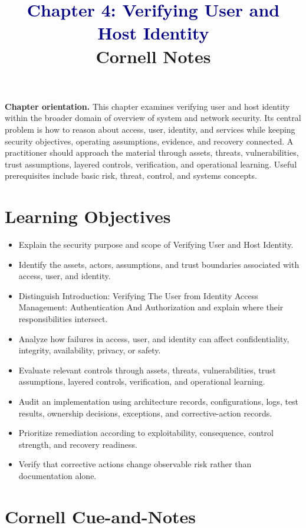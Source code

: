 \documentclass[11pt]{article}
\title{\textcolor{Navy}{Chapter 4: Verifying User and Host Identity}\\[2mm]\large Cornell Notes}
\author{}
\date{}
\begin{document}
\maketitle
\thispagestyle{fancy}
\vspace{-1.5em}
\begin{orientationbox}
\textbf{Chapter orientation.} This chapter examines verifying user and host identity within the broader domain of overview of system and network security. Its central problem is how to reason about access, user, identity, and services while keeping security objectives, operating assumptions, evidence, and recovery connected. A practitioner should approach the material through assets, threats, vulnerabilities, trust assumptions, layered controls, verification, and operational learning. Useful prerequisites include basic risk, threat, control, and systems concepts.
\end{orientationbox}
\section*{Learning Objectives}
\begin{itemize}
\item Explain the security purpose and scope of Verifying User and Host Identity.
\item Identify the assets, actors, assumptions, and trust boundaries associated with access, user, and identity.
\item Distinguish Introduction: Verifying The User from Identity Access Management: Authentication And Authorization and explain where their responsibilities intersect.
\item Analyze how failures in access, user, and identity can affect confidentiality, integrity, availability, privacy, or safety.
\item Evaluate relevant controls through assets, threats, vulnerabilities, trust assumptions, layered controls, verification, and operational learning.
\item Audit an implementation using architecture records, configurations, logs, test results, ownership decisions, exceptions, and corrective-action records.
\item Prioritize remediation according to exploitability, consequence, control strength, and recovery readiness.
\item Verify that corrective actions change observable risk rather than documentation alone.
\end{itemize}
\section*{Cornell Cue-and-Notes}
\end{document}

